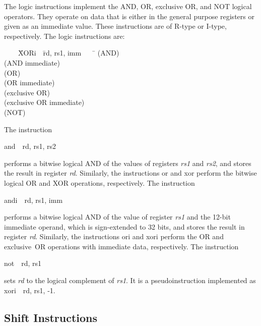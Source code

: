 \documentclass[11pt, twoside, pdftex]{article}
\newenvironment{ctabbing}%
{\begin{center}\begin{minipage}{\textwidth}\begin{tabbing}}
{\end{tabbing}\end{minipage}\end{center}}
\begin{document}
The logic instructions implement the AND, OR, exclusive OR, and NOT logical operators. They 
operate on data that is either in the general purpose registers or given as an immediate
value. These instructions are of R-type or I-type, respectively. The logic instructions are:
\vspace{-\baselineskip}
\begin{ctabbing}
~~~~\={\sf XORi}~~\={\sf rd, rs1, imm}~~~~\=\kill
{} \>(AND)\\
 \>(AND immediate)\\
 \>(OR)\\
 \>(OR immediate)\\
 \>(exclusive OR)\\
 \>(exclusive OR immediate)\\
 \>(NOT)\\
\end{ctabbing}
\vspace{-\baselineskip}
The instruction
\vspace{-\baselineskip}
\begin{center}
{\sf and~~rd, rs1, rs2} 
\end{center}
\noindent
performs a bitwise logical AND of the values of registers {\it rs1} and {\it rs2}, and stores 
the result in register {\it rd}. Similarly, the instructions {\sf or} and {\sf xor}
perform the bitwise logical OR and XOR operations, respectively.  The instruction
\vspace{-\baselineskip}
\begin{center}
{\sf andi~~rd, rs1, imm} 
\end{center}
\noindent
performs a bitwise logical AND of the value of register {\it rs1} and the 12-bit immediate
operand, which is sign-extended to 32 bits, and stores the result in register {\it rd}.
Similarly, the instructions {\sf ori} and {\sf xori} perform the OR and exclusive~OR operations 
with immediate data, respectively.
The instruction
\vspace{-\baselineskip}
\begin{center}
{\sf not~~rd, rs1} 
\end{center}
\noindent
sets {\it rd} to the logical complement of {\it rs1}. It is a pseudoinstruction
implemented as {\sf xori~~rd, rs1, -1}.
\subsection{Shift Instructions}
\end{document}
